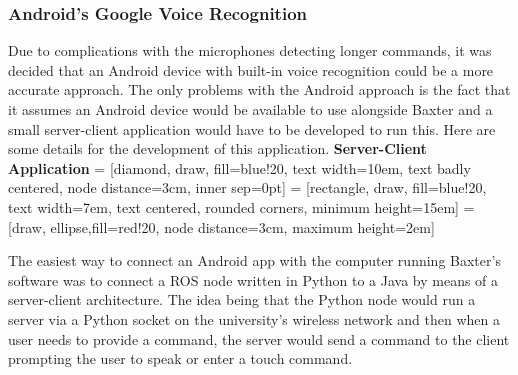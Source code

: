 \subsubsection{Android's Google Voice Recognition}
Due to complications with the microphones detecting longer commands, it was decided that an Android device with built-in voice recognition could be a more accurate approach. The only problems with the Android approach is the fact that it assumes an Android device would be available to use alongside Baxter and a small server-client application would have to be developed to run this. Here are some details for the development of this application.
\newline\newline
\textbf{Server-Client Application} 
\newline\newline
{} = [diamond, draw, fill=blue!20, 
    text width=10em, text badly centered, node distance=3cm, inner sep=0pt]
 = [rectangle, draw, fill=blue!20, 
    text width=7em, text centered, rounded corners, minimum height=15em]
 = [draw, ellipse,fill=red!20, node distance=3cm,
    maximum height=2em]
\newline\newline
The easiest way to connect an Android app with the computer running Baxter's software was to connect a ROS node written in Python to a Java by means of a server-client architecture. The idea being that the Python node would run a server via a Python socket on the university's wireless network and then when a user needs to provide a command, the server would send a command to the client prompting the user to speak or enter a touch command.
\newline\newline
